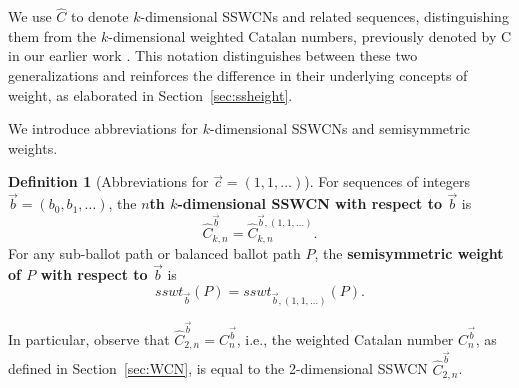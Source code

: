 \documentclass[11pt]{article}
\theoremstyle{remark}
\theoremstyle{definition}
\newtheorem{definition}[theorem]{Definition}
\begin{document}
We use $\widehat{C}$ to denote $k$-dimensional SSWCNs and related sequences, distinguishing them from the $k$-dimensional weighted Catalan numbers, previously denoted by C in our earlier work \cite{MR5034574}. This notation distinguishes between these two generalizations and reinforces the difference in their underlying concepts of weight, as elaborated in Section~\ref{sec:ssheight}.

We introduce abbreviations for $k$-dimensional SSWCNs and semisymmetric weights.

\begin{definition}[Abbreviations for $\vec{c} = (1, 1, \dots)$]\label{def:shorthand1}
For sequences of integers $\vec{b} = (b_0, b_1, \dots)$, the \textbf{$n$th $k$-dimensional SSWCN with respect to $\vec{b}$} is $$\widehat{C}_{k,n}^{\vec{b}} = \widehat{C}_{k,n}^{\vec{b},(1,1,\dots)}.$$ For any sub-ballot path or balanced ballot path $P$, the \textbf{semisymmetric weight of $P$ with respect to $\vec{b}$} is  $$sswt_{\vec{b}}(P) = sswt_{\vec{b}, (1,1, \dots)}(P).$$
\end{definition}

In particular, observe that $\widehat{C}_{2, n}^{\vec{b}} = C_n^{\vec{b}}$, i.e., the weighted Catalan number $C_n^{\vec{b}}$, as defined in Section~\ref{sec:WCN}, is equal to the 2-dimensional SSWCN $\widehat{C}_{2, n}^{\vec{b}}$.
\end{document}

